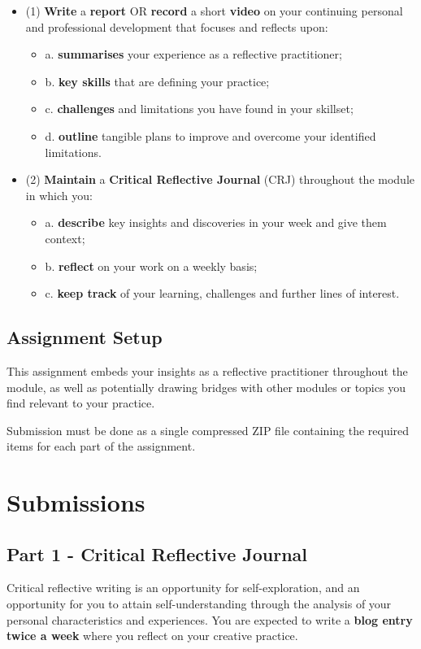 \documentclass{../../fal_assignment}
\begin{document}
\begin{itemize}
		\item (1)  \textbf{Write} a \textbf{report} OR \textbf{record} a short \textbf{video} on your continuing personal and professional development that focuses and reflects upon:
		\begin{itemize}
			\item a.  \textbf{summarises} your experience as a reflective practitioner;
			\item b.  \textbf{key skills} that are defining your practice;
			\item c.  \textbf{challenges} and limitations you have found in your skillset;
			\item d.  \textbf{outline} tangible plans to improve and overcome your identified limitations.
		\end{itemize}
		\item (2)  \textbf{Maintain} a \textbf{Critical Reflective Journal} (CRJ) throughout the module in which you:
		\begin{itemize}
			\item a.  \textbf{describe} key insights and discoveries in your week and give them context;
			\item b.  \textbf{reflect} on your work on a weekly basis;
			\item c.  \textbf{keep track} of your learning, challenges and further lines of interest.
		\end{itemize}
\end{itemize}
\subsection*{Assignment Setup} 

This assignment embeds your insights as a reflective practitioner throughout the module, as well as potentially drawing bridges with other modules or topics you find relevant to your practice.

Submission must be done as a single compressed ZIP file containing the required items for each part of the assignment.
\pagebreak
\section*{Submissions}
\subsection*{Part 1 - Critical Reflective Journal} 

Critical reflective writing is an opportunity for self-exploration, and an opportunity for you to attain self-understanding through the analysis of your personal characteristics and experiences. You are expected to write a \textbf{blog entry twice a week} where you reflect on your creative practice.
\end{document}
